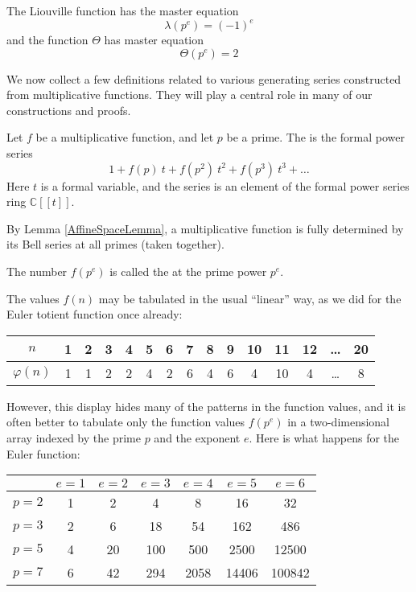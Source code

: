 \begin{example}
The Liouville function has the master equation
$$ \lambda(p^e) = (-1)^e  $$
and the function $\Theta$ has master equation
$$ \Theta(p^e) = 2   $$
\end{example}

We now collect a few definitions related to various generating series constructed from multiplicative functions. They will play a central role in many of our constructions and proofs.

\begin{definition}
Let $f$ be a multiplicative function, and let $p$ be a prime. The  is the formal power series
$$ 1 + f(p) \ t + f(p^2) \ t^2 + f(p^3) \ t^3 + \ldots    $$ 
Here $t$ is a formal variable, and the series is an element of the formal power series ring $\mathbb{C}[[t]]$.
\end{definition}

\begin{remark}
By Lemma \ref{AffineSpaceLemma}, a multiplicative function is fully determined by its Bell series at all primes (taken together).
\end{remark}

\begin{definition}
The number $f(p^e)$ is called the  at the prime power $p^e$.
\end{definition}

The values $f(n)$ may be tabulated in the usual ``linear'' way, as we did for the Euler totient function once already:

\vspace{6pt}
\begin{tabular}{  | c || c | c | c | c | c | c | c | c | c | c | c | c | c | c |  }
  \hline			
  $n$ & 1 & 2 & 3 & 4 & 5 & 6 & 7 & 8 & 9 & 10 & 11 & 12 & \ldots & 20  \\
  \hline
  $\varphi(n) $ & 1 & 1 & 2 & 2 & 4 & 2 & 6 & 4 & 6 & 4 & 10 & 4 & \ldots & 8  \\
  \hline  
\end{tabular}
\vspace{6pt}

However, this display hides many of the patterns in the function values, and it is often better to tabulate only the function values $f(p^e)$ in a two-dimensional array indexed by the prime $p$ and the exponent $e$. Here is what happens for the Euler function:

\begin{center}
\begin{tabular}{| l | | c | c | c | c | c | c |}
\hline
& $e = 1$ & $e = 2$ & $e = 3$ & $e = 4$ & $e = 5$ & $e = 6$ \\
\hline
\hline
$p = 2$ & 1 & 2 & 4 & 8 & 16 & 32 \\
\hline
$p = 3$ & 2 & 6 & 18 & 54 & 162 & 486 \\
\hline
$p = 5$ & 4 & 20 & 100 & 500 & 2500 & 12500 \\
\hline
$p = 7$ & 6 & 42 & 294 & 2058 & 14406 & 100842 \\
\hline
\end{tabular}
\end{center}

